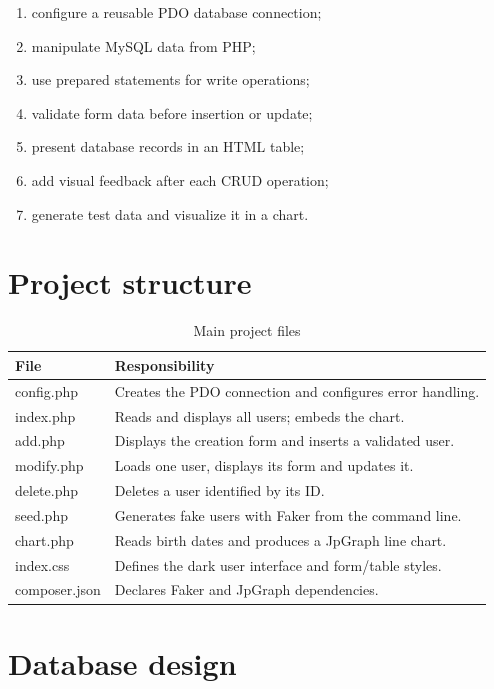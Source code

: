 \documentclass[12pt,a4paper]{article}
\begin{document}
\begin{enumerate}[nosep]
    \item configure a reusable PDO database connection;
    \item manipulate MySQL data from PHP;
    \item use prepared statements for write operations;
    \item validate form data before insertion or update;
    \item present database records in an HTML table;
    \item add visual feedback after each CRUD operation;
    \item generate test data and visualize it in a chart.
\end{enumerate}

\section{Project structure}

\begin{table}[H]
\centering
\begin{tabular}{>{\ttfamily}p{}p{}}
\toprule
\textnormal{File} & \textnormal{Responsibility}\\
\midrule
config.php & Creates the PDO connection and configures error handling.\\
index.php & Reads and displays all users; embeds the chart.\\
add.php & Displays the creation form and inserts a validated user.\\
modify.php & Loads one user, displays its form and updates it.\\
delete.php & Deletes a user identified by its ID.\\
seed.php & Generates fake users with Faker from the command line.\\
chart.php & Reads birth dates and produces a JpGraph line chart.\\
index.css & Defines the dark user interface and form/table styles.\\
composer.json & Declares Faker and JpGraph dependencies.\\
\bottomrule
\end{tabular}
\caption{Main project files}
\end{table}

\section{Database design}
\end{document}
